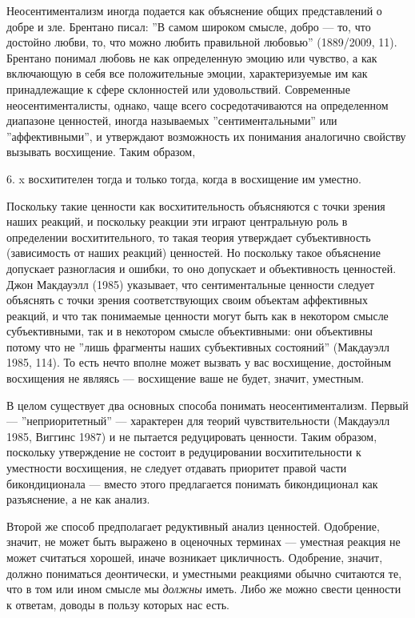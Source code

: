 \documentclass[11pt]{book}
\begin{document}
Неосентиментализм иногда подается как объяснение общих представлений о добре и зле. Брентано писал: ''В самом широком смысле, добро --- то, что достойно любви, то, что можно любить правильной любовью'' (1889/2009, 11). Брентано понимал любовь не как определенную эмоцию или чувство, а как включающую в себя все положительные эмоции, характеризуемые им как принадлежащие к сфере склонностей или удовольствий. Современные неосентименталисты, однако, чаще всего сосредотачиваются на определенном диапазоне ценностей, иногда называемых ''сентиментальными'' или ''аффективными'', и утверждают возможность их понимания аналогично свойству вызывать восхищение. Таким образом,

\smallskip

6. x восхитителен тогда и только тогда, когда в восхищение им уместно.

\smallskip

Поскольку такие ценности как восхитительность объясняются с точки зрения наших реакций, и поскольку реакции эти играют центральную роль в определении восхитительного, то такая теория утверждает субъективность (зависимость от наших реакций) ценностей. Но поскольку такое объяснение допускает разногласия и ошибки, то оно допускает и объективность ценностей. Джон Макдауэлл (1985) указывает, что сентиментальные ценности следует объяснять с точки зрения соответствующих своим объектам аффективных реакций, и что так понимаемые ценности могут быть как в некотором смысле субъективными, так и в некотором смысле объективными: они объективны потому что не ''лишь фрагменты наших субъективных состояний'' (Макдауэлл 1985, 114). То есть нечто вполне может вызвать у вас восхищение, достойным восхищения не являясь --- восхищение ваше не будет, значит, уместным.

В целом существует два основных способа понимать неосентиментализм. Первый --- ''неприоритетный'' --- характерен для теорий чувствительности (Макдауэлл 1985, Виггинс 1987) и не пытается редуцировать ценности. Таким образом, поскольку утверждение не состоит в редуцировании восхитительности к уместности восхищения, не следует отдавать приоритет правой части бикондиционала --- вместо этого предлагается понимать бикондиционал как разъяснение, а не как анализ.

Второй же способ предполагает редуктивный анализ ценностей. Одобрение, значит, не может быть выражено в оценочных терминах --- уместная реакция не может считаться хорошей, иначе возникает цикличность. Одобрение, значит, должно пониматься деонтически, и уместными реакциями обычно считаются те, что в том или ином смысле мы \textit{должны} иметь. Либо же можно свести ценности к ответам, доводы в пользу которых нас есть.
\end{document}
